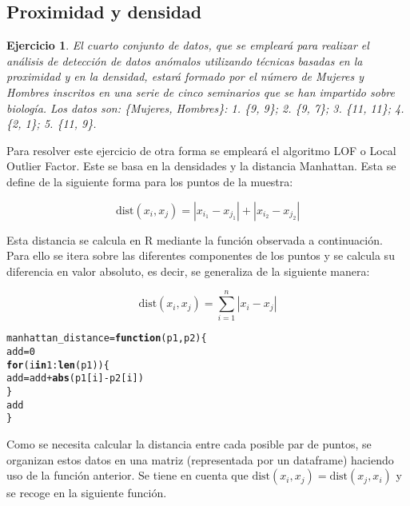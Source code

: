 \documentclass[12pt]{report}\usepackage[]{graphicx}\usepackage[dvipsnames]{xcolor}
\makeatletter
\newcommand{\hlnum}[1]{\textcolor[rgb]{0.686,0.059,0.569}{#1}}%
\newcommand{\hlopt}[1]{\textcolor[rgb]{0,0,0}{#1}}%
\newcommand{\hlstd}[1]{\textcolor[rgb]{0.345,0.345,0.345}{#1}}%
\newcommand{\hlkwa}[1]{\textcolor[rgb]{0.161,0.373,0.58}{\textbf{#1}}}%
\newcommand{\hlkwb}[1]{\textcolor[rgb]{0.69,0.353,0.396}{#1}}%
\newcommand{\hlkwc}[1]{\textcolor[rgb]{0.333,0.667,0.333}{#1}}%
\newcommand{\hlkwd}[1]{\textcolor[rgb]{0.737,0.353,0.396}{\textbf{#1}}}%
\newenvironment{kframe}{%
 \def\at@end@of@kframe{}%
 \ifinner\ifhmode%
  \def\at@end@of@kframe{\end{minipage}}%
  \begin{minipage}{\columnwidth}%
 \fi\fi%
 \def\FrameCommand##1{\hskip\@totalleftmargin \hskip-\fboxsep
 \colorbox{shadecolor}{##1}\hskip-\fboxsep
     \hskip-\linewidth \hskip-\@totalleftmargin \hskip\columnwidth}%
 \MakeFramed {\advance\hsize-\width
   \@totalleftmargin\z@ \linewidth\hsize
   \@setminipage}}%
 {\par\unskip\endMakeFramed%
 \at@end@of@kframe}
\newenvironment{knitrout}{}{} %
\newtheorem{exercise}{Ejercicio}[section]
\newcommand{\dt}{\text{dist}}
\makeatother
\begin{document}
			\subsection{Proximidad y densidad}
			
				\begin{exercise}
					El cuarto conjunto de datos, que se empleará para realizar el análisis de detección de datos anómalos utilizando técnicas basadas en la proximidad y en la densidad, estará formado por el número de Mujeres y Hombres inscritos en una serie de cinco seminarios que se han impartido sobre biología. Los datos son: \{Mujeres, Hombres\}: 1. \{9, 9\}; 2. \{9, 7\}; 3. \{11, 11\}; 4. \{2, 1\}; 5. \{11, 9\}.
				\end{exercise}
					
					Para resolver este ejercicio de otra forma se empleará el algoritmo LOF o Local Outlier Factor. Este se basa en la densidades y la distancia Manhattan. Esta se define de la siguiente forma para los puntos de la muestra: 
					
					$$
					\dt(x_i, x_j) = |x_{i_1}-x_{j_1}| + |x_{i_2}-x_{j_2}|
					$$
					
					Esta distancia se calcula en R mediante la función observada a continuación. Para ello se itera sobre las diferentes componentes de los puntos y se calcula su diferencia en valor absoluto, es decir, se generaliza de la siguiente manera: 
					
					$$
					\dt(x_i, x_j) = \sum_{i=1}^n |x_i-x_j|
					$$
					
\begin{knitrout}
\color{fgcolor}\begin{kframe}
\begin{alltt}
\hlstd{manhattan_distance} \hlkwb{=} \hlkwa{function}\hlstd{(}\hlkwc{p1}\hlstd{,} \hlkwc{p2}\hlstd{) \{}
        \hlstd{add} \hlkwb{=} \hlnum{0}
        \hlkwa{for}\hlstd{(i} \hlkwa{in} \hlnum{1}\hlopt{:}\hlkwd{len}\hlstd{(p1))\{}
                \hlstd{add} \hlkwb{=} \hlstd{add} \hlopt{+} \hlkwd{abs}\hlstd{(p1[i]} \hlopt{-} \hlstd{p2[i])}
        \hlstd{\}}
        \hlstd{add}
\hlstd{\}}
\end{alltt}
\end{kframe}
\end{knitrout}
					
					Como se necesita calcular la distancia entre cada posible par de puntos, se organizan estos datos en una matriz (representada por un dataframe) haciendo uso de la función anterior. Se tiene en cuenta que $\dt(x_i, x_j) = \dt(x_j, x_i)$ y se recoge en la siguiente función. 
					
\end{document}
